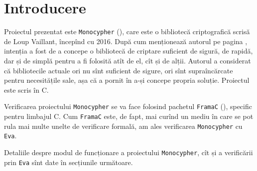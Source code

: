 \chapter*{Introducere}

\indent\indent Proiectul prezentat este \texttt{Monocypher} (\cite{gh1}), care este o bibliotecă
criptografică scrisă de Loup Vaillant, începînd cu 2016. După cum menționează
autorul pe pagina \cite{loupcrypto}, intenția a fost de a concepe o bibliotecă
de criptare suficient de sigură, de rapidă, dar și de simplă pentru a fi folosită
atît de el, cît și de alții. Autorul a considerat că bibliotecile actuale ori nu
sînt suficient de sigure, ori sînt supraîncărcate pentru necesitățile sale,
așa că a pornit în a-și concepe propria soluție. Proiectul este scris în C.

Verificarea proiectului \texttt{Monocypher} se va face folosind pachetul
\texttt{FramaC} (\cite{framac}), specific pentru limbajul C. Cum \texttt{FramaC}
este, de fapt, mai curînd un mediu în care se pot rula mai multe unelte de verificare
formală, am ales verificarea \texttt{Monocypher} cu \texttt{Eva}.

Detaliile despre modul de funcționare a proiectului \texttt{Monocypher}, cît și
a verificării prin \texttt{Eva} sînt date în secțiunile următoare.

